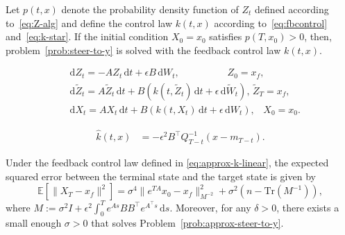 \documentclass[10pt,a4paper]{amsart}
\newcommand{\Expect}{\mathbb{E}}
\newcommand{\trace}{\text{Tr}}
\newcommand{\ud}{\,\mathrm{d}}
\begin{document}
\begin{proposition}\label{prop:sol2p1}
Let $p(t,x)$ denote the probability density function  of $Z_t$ defined according to~\eqref{eq:Z-alg} and define the control law $k(t,x)$ according to~\eqref{eq:fbcontrol} and~\eqref{eq:k-star}. If the initial condition $X_0=x_0$ satisfies $p(T,x_0)>0$, then, problem~\ref{prob:steer-to-y} is solved with the feedback control law $k(t,x)$. 
\end{proposition}

\begin{align}
    &\ud Z_t = -A Z_t \ud t + \epsilon B \ud W_t, \hspace{59pt} Z_0 = x_f,\label{eq:Z-lin}\\
    &\ud \tilde Z_t = A \tilde Z_t \ud t + B( k(t,\tilde Z_t) \ud t +\epsilon \ud \tilde W_t), \hspace{2pt} \tilde Z_T = x_f, \label{eq:tilde-Z-lin}\\
    &\ud X_t \!=\! A X_t \ud t \!+\! B(k(t,X_t)\ud t \!+ \!\epsilon \ud W_t), \hspace{10pt} X_0\! =\! x_0. \label{eq:X-lin}
\end{align}

\begin{align}\label{eq:approx-k-linear}
    \hat k(t,x) 
    &= -\epsilon^2 B^\top Q_{T-t}^{-1}(x-m_{T-t}).
\end{align}

\begin{proposition}\label{prop:terminal-error}
    Under the feedback control law defined in \eqref{eq:approx-k-linear}, the expected squared error between the terminal state and the target state is given by
    \begin{equation}\label{eq:error}
        \Expect[\|X_T-x_f\|^2] = \sigma^4\|e^{TA}x_0-x_f\|^2_{M^{-2}} + \sigma^2(n -\trace(M^{-1})),
    \end{equation}
    where $M := \sigma^2 I +  \epsilon^2\int_0^T e^{As}BB^\top e^{A^\top s}\ud s$. Moreover, for any $\delta>0$, there exists a small enough $\sigma>0$ that solves Problem~\ref{prob:approx-steer-to-y}.
\end{proposition}
\end{document}
